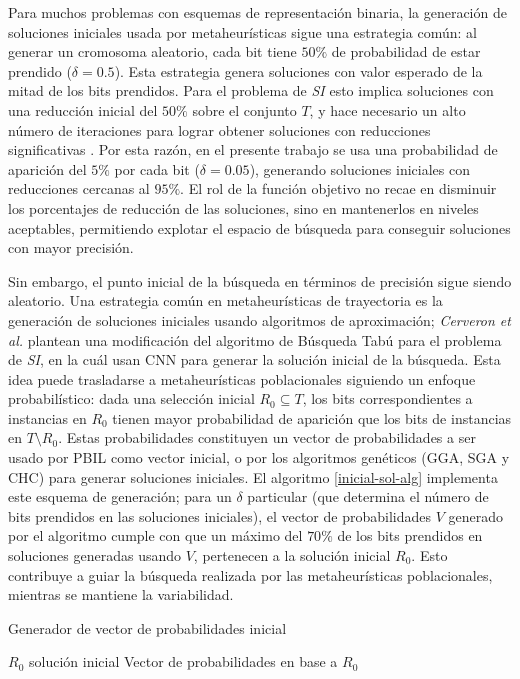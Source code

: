 Para muchos problemas con esquemas de representación binaria, la generación de soluciones iniciales usada por metaheurísticas sigue una estrategia común: al generar un cromosoma aleatorio, cada bit tiene $50\%$ de probabilidad de estar prendido ($\delta = 0.5$). Esta estrategia genera soluciones con valor esperado de la mitad de los bits prendidos. Para el problema de \emph{SI} esto implica soluciones con una reducción inicial del $50\%$ sobre el conjunto $T$, y hace necesario un alto número de iteraciones para lograr obtener soluciones con reducciones significativas \cite{cano2003using}. Por esta razón, en el presente trabajo se usa una probabilidad de aparición del $5\%$ por cada bit ($\delta = 0.05$), generando soluciones iniciales con reducciones cercanas al $95\%$. El rol de la función objetivo no recae en disminuir los porcentajes de reducción de las soluciones, sino en mantenerlos en niveles aceptables, permitiendo explotar el espacio de búsqueda para conseguir soluciones con mayor precisión.

Sin embargo, el punto inicial de la búsqueda en términos de precisión sigue siendo aleatorio. Una estrategia común en metaheurísticas de trayectoria es la generación de soluciones iniciales usando algoritmos de aproximación; \emph{Cerveron et al.} \cite{cerveron2001another} plantean una modificación del algoritmo de Búsqueda Tabú para el problema de \emph{SI}, en la cuál usan CNN para generar la solución inicial de la búsqueda. Esta idea puede trasladarse a metaheurísticas poblacionales siguiendo un enfoque probabilístico: dada una selección inicial $R_0 \subseteq T$, los bits correspondientes a instancias en $R_0$ tienen mayor probabilidad de aparición que los bits de instancias en $T \setminus R_0$. Estas probabilidades constituyen un vector de probabilidades a ser usado por PBIL como vector inicial, o por los algoritmos genéticos (GGA, SGA y CHC) para generar soluciones iniciales. El algoritmo \ref{inicial-sol-alg} implementa este esquema de generación; para un $\delta$ particular (que determina el número de bits prendidos en las soluciones iniciales), el vector de probabilidades $V$ generado por el algoritmo cumple con que un máximo del $70\%$ de los bits prendidos en soluciones generadas usando $V$, pertenecen a la solución inicial $R_0$. Esto contribuye a guiar la búsqueda realizada por las metaheurísticas poblacionales, mientras se mantiene la variabilidad.

\begin{algorithm}
\caption{Generador de vector de probabilidades inicial}
\label{inicial-sol-alg}
\begin{algorithmic}[1]

\Require $R_0$ solución inicial
\Ensure Vector de probabilidades en base a $R_0$

	\Else
	\EndIf
\EndFor
\State {}
\end{algorithmic}
\end{algorithm}

